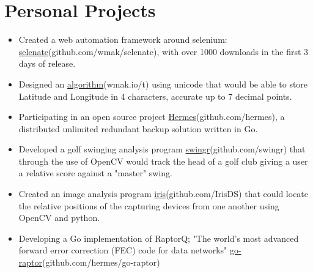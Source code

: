 \documentclass[a4paper, 10pt]{article}
\newcommand{\uhref}[2]{\href{#1}{\color{gray}#2}}
\begin{document}
\section{\bf{Personal Projects}}
\begin{itemize}
	\setlength\itemsep{0.1em}
	\item Created a web automation framework around selenium:
		\uhref{https://github.com/wmak/selenate}{selenate}(github.com/wmak/selenate),
		with over 1000 downloads in the first 3 days of release.
	\item Designed an \uhref{http://wmak.io/t.html}{algorithm}(wmak.io/t) using
		unicode that would be able to store Latitude and Longitude in 4
		characters, accurate up to 7 decimal points.  
	\item Participating in an open source project
		\uhref{https://github.com/hermes}{Hermes}(github.com/hermes), a
		distributed unlimited redundant backup solution written in Go.  
	\item Developed a golf swinging analysis program
		\uhref{http://github.com/swingr/}{swingr}(github.com/swingr) that through
		the use of OpenCV would track the head of a golf club giving a user a
		relative score against a "master" swing.
	\item Created an image analysis program
		\uhref{https://github.com/IrisDS}{iris}(github.com/IrisDS)
		that could locate the relative positions of the capturing devices from
		one another using OpenCV and python.
	\item Developing a Go implementation of RaptorQ; "The world's most advanced
		forward error correction (FEC) code for data networks"
		\uhref{https://github.com/hermes/go-raptor}{go-raptor}(github.com/hermes/go-raptor)
\end{itemize}
\end{document}
